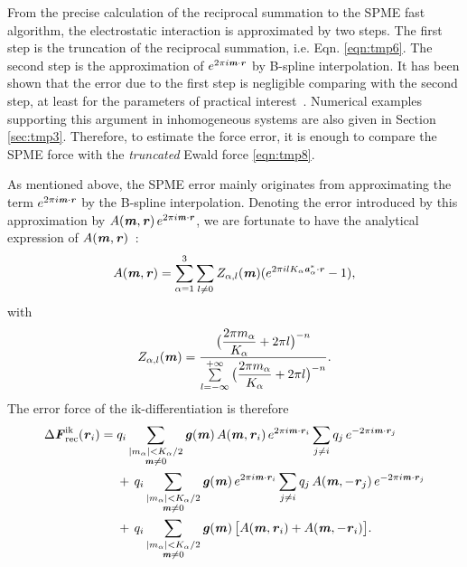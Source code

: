 \documentclass[aps,pre,preprint,unsortedaddress]{revtex4}
\renewcommand{\v}[1]{\textbf{\textit{#1}}}
\begin{document}
From the precise calculation of the reciprocal summation to the SPME
fast algorithm, the electrostatic interaction is approximated by two
steps.  The first step is the truncation of the reciprocal summation,
i.e. Eqn. \eqref{eqn:tmp6}. The second step is the approximation of
$e^{2\pi i\v m\cdot\v r}$ by B-spline
interpolation. It has been shown that the
error due to the first step is negligible comparing with the second
step,
at least for the parameters of practical interest~\cite{wang2010optimizing}.
Numerical
examples supporting this argument in inhomogeneous systems are also
given in Section \ref{sec:tmp3}.  Therefore, to estimate the force
error, it is enough to compare the SPME force with the
\emph{truncated} Ewald force \eqref{eqn:tmp8}. 

As mentioned above, the SPME error mainly originates from approximating
the term $e^{2\pi i\v m\cdot\v r}$ by the B-spline
interpolation. Denoting the error introduced by this approximation by
$A(\v m, \v r)\,e^{2\pi i\v m\cdot \v r}$, we are fortunate to have
the analytical expression of $A(\v m, \v r)$~\cite{schoenberg1987cardinal}:
\begin{align}\label{eqn:error-A}
  A(\v m, \v r)
  =
  \sum_{\alpha=1}^3\sum_{l\neq 0}
  Z_{\alpha,l}(\v m)
  (
  e^{2\pi i l K_\alpha\v a^\ast_\alpha\cdot \v r} - 1
  ),
\end{align}
with
\begin{align}
  Z_{\alpha,l}(\v m) = \frac
  {\big(\dfrac{2\pi m_\alpha}{K_\alpha} + 2\pi l\big)^{-n}}
  {\sum\limits_{l=-\infty}^{+\infty}
    \big(\dfrac{2\pi m_\alpha}{K_\alpha} + 2\pi l\big)^{-n}}.
\end{align}
The error force of the ik-differentiation is therefore
\begin{align}\nonumber
  \Delta\v F_{\textrm{rec}}^{\textrm{ik}}(\v r_i)
  =\;&
  q_i
  \sum_{
    \begin{subarray}{c}
      \vert m_{\alpha}\vert < K_\alpha/2\\
      \v m\neq 0
    \end{subarray}}
  \v g(\v m)\,
  A(\v m, \v r_i)\,
  e^{2\pi i\v m\cdot \v r_i}
  \sum_{j\neq i}q_j\,e^{-2\pi i\v m\cdot\v r_j} \\\nonumber
  & +\,
  q_i
  \sum_{
    \begin{subarray}{c}
      \vert m_{\alpha}\vert < K_\alpha/2\\
      \v m\neq 0
    \end{subarray}}
  \v g(\v m)\,
  e^{2\pi i\v m\cdot \v r_i}
  \sum_{j\neq i}q_j\,A(\v m, -\v r_j)\,e^{-2\pi i\v m\cdot\v r_j}\\\label{eqn:ik.error.force.1}
  & +\,
  q_i
  \sum_{
    \begin{subarray}{c}
      \vert m_{\alpha}\vert < K_\alpha/2\\
      \v m\neq 0
    \end{subarray}}
  \v g(\v m)\,
  \big[
  A(\v m, \v r_i) +
  A(\v m, -\v r_i)
  \big].
\end{align}
\end{document}
